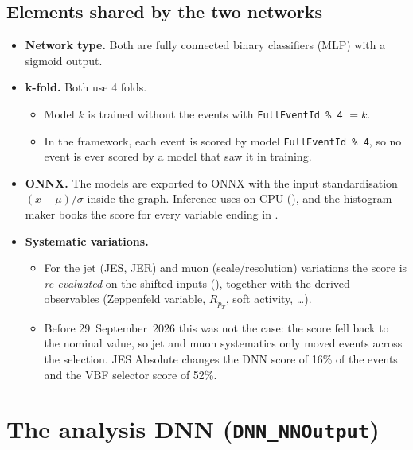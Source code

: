\documentclass[11pt,a4paper]{article}
\begin{document}
\subsection{Elements shared by the two networks}
\begin{itemize}
  \item \textbf{Network type.} Both are fully connected binary classifiers (MLP)
  with a sigmoid output.
  \item \textbf{k-fold.} Both use 4 folds.
  \begin{itemize}
    \item Model $k$ is trained without the events with
    \texttt{FullEventId~\%~4} $= k$.
    \item In the framework, each event is scored by model
    \texttt{FullEventId~\%~4}, so no event is ever scored by a model that saw it
    in training.
  \end{itemize}
  \item \textbf{ONNX.} The models are exported to ONNX with the input
  standardisation $(x-\mu)/\sigma$ inside the graph. Inference uses
   on CPU (), and the
  histogram maker books the score for every variable ending in .
  \item \textbf{Systematic variations.}
  \begin{itemize}
    \item For the jet (JES, JER) and muon (scale/resolution) variations the
    score is \emph{re-evaluated} on the shifted inputs
    (), together with the derived observables
    (Zeppenfeld variable, $R_{p_T}$, soft activity, \dots).
    \item Before 29~September~2026 this was not the case: the score fell back
    to the nominal value, so jet and muon systematics only moved events
    across the selection. JES Absolute changes the DNN score of 16\% of the
    events and the VBF selector score of 52\%.
  \end{itemize}
\end{itemize}

\section{The analysis DNN (\texttt{DNN\_NNOutput})}
\end{document}
